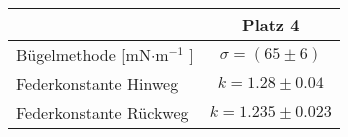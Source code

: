 \begin{table}[H]
			\centering
				\begin{tabular}{|l||c|}
				\hline
				& Platz 4 \\
				\hline
				\hline
				Bügelmethode [mN$ \cdot $m$ ^{-1} $ ]& $\sigma=(65 \pm 6)$ \\
				\hline
				Federkonstante Hinweg & $k=1.28 \pm 0.04$ \\
				\hline
				Federkonstante Rückweg & $k= 1.235 \pm 0.023 $ \\
				\hline
			\end{tabular}
		\end{table}